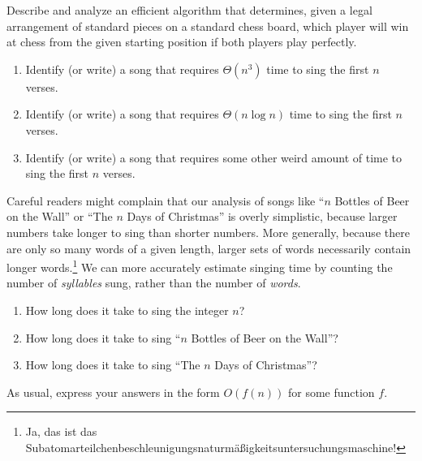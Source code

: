 \begin{exercises}
\setcounter{enumi}{-1}
\item Describe and analyze an efficient algorithm that determines, given a legal arrangement of standard pieces on a standard chess board, which player will win at chess from the given starting position if both players play perfectly. 
\item {}
\begin{enumerate}
\item Identify (or write) a song that requires $\Theta(n^3)$ time to sing the first $n$ verses.
\item Identify (or write) a song that requires $\Theta(n \log n)$ time to sing the first $n$ verses.
\item Identify (or write) a song that requires some other weird amount of time to sing the first $n$ verses.
\end{enumerate}
\item Careful readers might complain that our analysis of songs like “$n$ Bottles of Beer on the Wall” or “The $n$ Days of Christmas” is overly simplistic, because larger numbers take longer to sing than shorter numbers. More generally, because there are only so many words of a given length, larger sets of words necessarily contain longer words.\footnote{Ja, das ist das Subatomarteilchenbeschleunigungsnaturmäßigkeitsuntersuchungsmaschine!} We can more accurately estimate singing time by counting the number of \textit{syllables} sung, rather than the number of \textit{words}.
\begin{enumerate}
\item How long does it take to sing the integer $n$?
\item How long does it take to sing “$n$ Bottles of Beer on the Wall”?
\item How long does it take to sing “The $n$ Days of Christmas”?
\end{enumerate}
As usual, express your answers in the form $O(f(n))$ for some function $f$.

\end{exercises}

